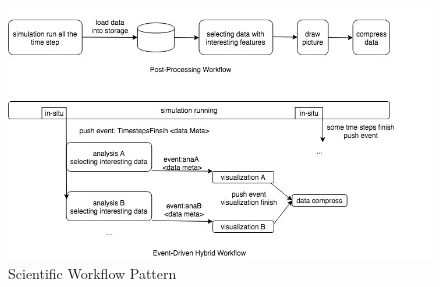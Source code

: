 \begin{figure} 
\centering
\includegraphics[width=1.0\linewidth]{./figure/hybridapplication.jpg}
\caption{Scientific Workflow Pattern}
 \label{fg:state}
\end{figure} 